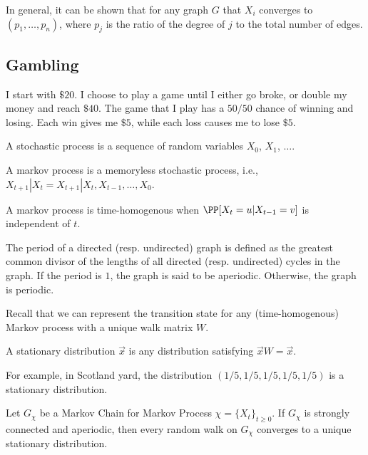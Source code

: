 In general, it can be shown that for any graph $G$ that $X_i$ converges to $(p_1, \hdots, p_n)$, where $p_j$ is the ratio of the degree of $j$ to the total number of edges. 

\subsection{Gambling}

I start with $\$20$. I choose to play a game until I either go broke, or double my money and reach $\$40$. The game that I play has a $50/50$ chance of winning and losing. Each win gives me $\$5$, while each loss causes me to lose $\$5$.

\begin{definition}

A stochastic process is a sequence of random variables $X_0$, $X_1$, $\hdots$.
\end{definition}

\begin{definition}

A markov process is a memoryless stochastic process, i.e., $X_{t+1}|X_t = X_{t+1}|X_t,X_{t-1}, \hdots, X_0$. 
\end{definition}

\begin{definition}

A markov process is \ac{time-homogenous} when $\PP[X_t=u|X_{t-1}=v]$ is independent of $t$. 
\end{definition}

\begin{definition}

The \ac{period} of a directed (resp. undirected) graph is defined as the greatest common divisor of the lengths of all directed (resp. undirected) cycles in the graph. If the period is $1$, the graph is said to be \ac{aperiodic}. Otherwise, the graph is \ac{periodic}. 
\end{definition}

Recall that we can represent the transition state for any (time-homogenous) Markov process with a unique walk matrix $W$.

\begin{definition}

A stationary distribution $\vec{x}$ is any distribution satisfying $\vec{x}W=\vec{x}$. 
\end{definition}

For example, in Scotland yard, the distribution $(1/5, 1/5, 1/5, 1/5, 1/5)$ is a stationary distribution.

\begin{theorem}

Let $G_{\chi}$ be a Markov Chain for Markov Process $\chi=\{X_t\}_{t\geq 0}$. If $G_{\chi}$ is strongly connected and aperiodic, then every random walk on $G_{\chi}$ converges to a unique stationary distribution. 
\end{theorem}